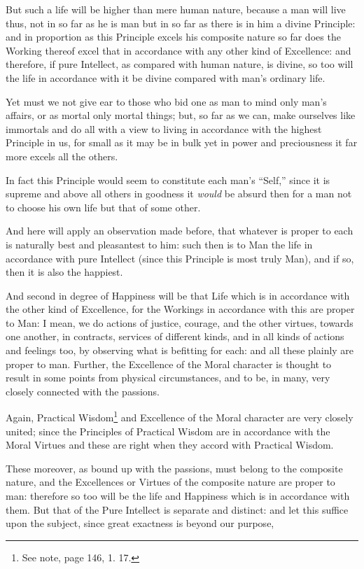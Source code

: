 But such a life will be higher than mere human nature, because a man will live
thus, not in so far as he is man but in so far as there is in him a divine
Principle: and in proportion as this Principle excels his composite nature so
far does the Working thereof excel that in accordance with any other kind of
Excellence: and therefore, if pure Intellect, as compared with human nature, is
divine, so too will the life in accordance with it be divine compared with
man’s ordinary life.

Yet must we not give ear to those who bid one as man to mind only man’s
affairs, or as mortal only mortal things; but, so far as we can, make ourselves
like immortals and do all with a view to living in accordance with the highest
Principle in us, for small as it may be in bulk yet in power and preciousness
it far more excels all the others.

In fact this Principle would seem to constitute each man’s
“Self,” since it is supreme and above all others in goodness it
\emph{would} be absurd then for a man not to choose his own life but that of
some other.

And here will apply an observation made before, that whatever is proper to each
is naturally best and pleasantest to him: such then is to Man the life in
accordance with pure Intellect (since this Principle is most truly Man), and if
so, then it is also the happiest.

And second in degree of Happiness will be that Life which is in accordance with
the other kind of Excellence, for the Workings in accordance with this are
proper to Man: I mean, we do actions of justice, courage, and the other
virtues, towards one another, in contracts, services of different kinds, and in
all kinds of actions and feelings too, by observing what is befitting for each:
and all these plainly are proper to man. Further, the Excellence of the Moral
character is thought to result in some points from physical circumstances, and
to be, in many, very closely connected with the passions.

Again, Practical Wisdom\footnote{See note, page 146, 1. 17.}
and Excellence of the Moral character are very closely united; since the
Principles of Practical Wisdom are in accordance with the Moral Virtues and
these are right when they accord with Practical Wisdom.

These moreover, as bound up with the passions, must belong to the composite
nature, and the Excellences or Virtues of the composite nature are proper to
man: therefore so too will be the life and Happiness which is in accordance
with them. But that of the Pure Intellect is separate and distinct: and let
this suffice upon the subject, since great exactness is beyond our purpose,


